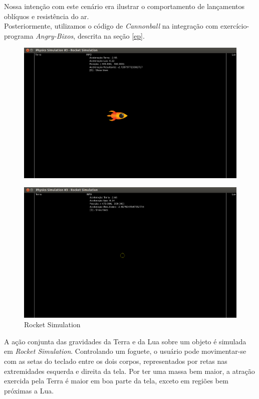 Nossa intenção com este cenário era ilustrar o comportamento de lançamentos oblíquos e resistência do ar. \\

Posteriormente, utilizamos o código de \textit{Cannonball} na integração com exercício-programa \textit{Angry-Bixos}, descrita na seção \ref{ep}. \\

\newpage

\begin{figure}[H]
\centering
	\includegraphics[scale=0.3]{images/rocket-simulation.png}
\end{figure}

\begin{figure}[H]
\centering
	\includegraphics[scale=0.3]{images/rocket-simulationE.png}
	\caption{Rocket Simulation}
\end{figure}

A ação conjunta das gravidades da Terra e da Lua sobre um objeto é simulada em \textit{Rocket Simulation}. Controlando um foguete, o usuário pode movimentar-se com as setas do teclado entre os dois corpos, representados por retas nas extremidades esquerda e direita da tela. Por ter uma massa bem maior, a atração exercida pela Terra é maior em boa parte da tela, exceto em regiões bem próximas a Lua. \\

